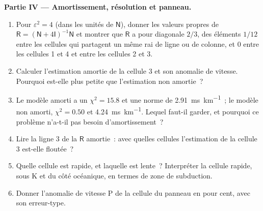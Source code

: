 \begin{problem}
\noindent\textbf{Partie IV --- Amortissement, résolution et panneau.}
\begin{enumerate}[resume]
  \item Pour $\varepsilon^2 = 4$ (dans les unités de $\mathsf N$), donner les
        valeurs propres de $\mathsf R = (\mathsf N + 4\mathsf I)^{-1}\mathsf N$ et
        montrer que $\mathsf R$ a pour diagonale $2/3$, des éléments $1/12$
        entre les cellules qui partagent un même rai de ligne ou de colonne, et $0$ entre les cellules 1
        et 4 et entre les cellules 2 et 3.
  \item Calculer l'estimation amortie de la cellule 3 et son anomalie de vitesse. Pourquoi est-elle
        plus petite que l'estimation non amortie~?
  \item Le modèle amorti a un $\chi^2 = 15.8$ et une norme de \qty{2.91}{ms.km^{-1}}~;
        le modèle non amorti, $\chi^2 = 0.50$ et \qty{4.24}{ms.km^{-1}}. Lequel faut-il
        garder, et pourquoi ce problème n'a-t-il pas besoin d'amortissement~?
  \item Lire la ligne 3 de la $\mathsf R$ amortie~: avec quelles cellules l'estimation
        de la cellule 3 est-elle floutée~?
  \item Quelle cellule est rapide, et laquelle est lente~? Interpréter la cellule rapide, sous
        K et du côté océanique, en termes de zone de subduction.
  \item Donner l'anomalie de vitesse P de la cellule du panneau en pour cent, avec son
        erreur-type.
\end{enumerate}
\end{problem}
